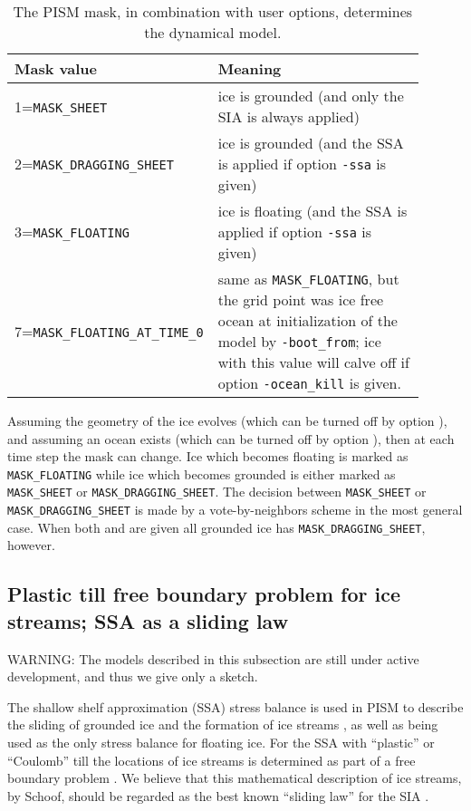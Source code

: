\begin{table}[ht]
\caption{The PISM mask, in combination with user options, determines the dynamical model.}\label{tab:maskvals} 
\small
\begin{tabular}{p{0.25\linewidth}p{0.65\linewidth}}\hline
\textbf{Mask value} & \textbf{Meaning}\\ \hline
1=\verb|MASK_SHEET| & ice is grounded (and only the SIA is always applied) \\
2=\verb|MASK_DRAGGING_SHEET| & ice is grounded (and the SSA is applied if option \verb|-ssa| is given) \\
3=\verb|MASK_FLOATING| & ice is floating (and the SSA is applied if option \verb|-ssa| is given) \\
7=\verb|MASK_FLOATING_AT_TIME_0| & same as \verb|MASK_FLOATING|, but the grid point was ice free ocean at initialization of the model by \verb|-boot_from|; ice with this value will calve off if option \verb|-ocean_kill| is given.\\
\hline\end{tabular}
\normalsize
\end{table}

Assuming the geometry of the ice evolves (which can be turned off by option ), and assuming an ocean exists (which can be turned off by option ), then at each time step the mask can change.  Ice which becomes floating is marked as \verb|MASK_FLOATING| while ice which becomes grounded is either marked as \verb|MASK_SHEET| or \verb|MASK_DRAGGING_SHEET|.  The decision between \verb|MASK_SHEET| or \verb|MASK_DRAGGING_SHEET| is made by a vote-by-neighbors scheme in the most general case.  When both  and  are given all grounded ice has \verb|MASK_DRAGGING_SHEET|, however.

\subsection{Plastic till free boundary problem for ice streams; SSA as a sliding law}  \label{subsect:plastic}
WARNING: The models described in this subsection are still under active development, and thus we give only a sketch.

The shallow shelf approximation (SSA) stress balance is used in PISM to describe the sliding of grounded ice and the formation of ice streams \cite{BBssasliding}, as well as being used as the only stress balance for floating ice.  For the SSA with ``plastic'' or ``Coulomb'' till the locations of ice streams is determined as part of a free boundary problem \cite{SchoofStream}.  We believe that this mathematical description of ice streams, by Schoof, should be regarded as the best known ``sliding law'' for the SIA \cite{BBssasliding}.

